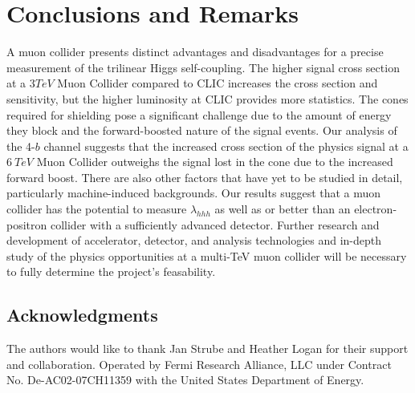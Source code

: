 \documentclass[12pt]{article}
\begin{document}


\section{Conclusions and Remarks}
A muon collider presents distinct advantages and disadvantages for a precise measurement of the trilinear Higgs self-coupling. The higher signal cross section at a $3TeV$ Muon Collider compared to CLIC increases the cross section and sensitivity, but the higher luminosity at CLIC provides more statistics. The cones required for shielding pose a significant challenge due to the amount of energy they block and the forward-boosted nature of the signal events. Our analysis of the 4-$b$ channel suggests that the increased cross section of the physics signal at a $6~TeV$ Muon Collider outweighs the signal lost in the cone due to the increased forward boost. There are also other factors that have yet to be studied in detail, particularly machine-induced backgrounds. Our results suggest that a muon collider has the potential to measure $\lambda_{hhh}$ as well as or better than an electron-positron collider with a sufficiently advanced detector. Further research and development of accelerator, detector, and analysis technologies and in-depth study of the physics opportunities at a multi-TeV muon collider will be necessary to fully determine the project's feasability.

\subsection{Acknowledgments}
The authors would like to thank Jan Strube and Heather Logan for their support and collaboration. Operated by Fermi Research Alliance, LLC under Contract No. De-AC02-07CH11359 with the United States Department of Energy.



\end{document}
